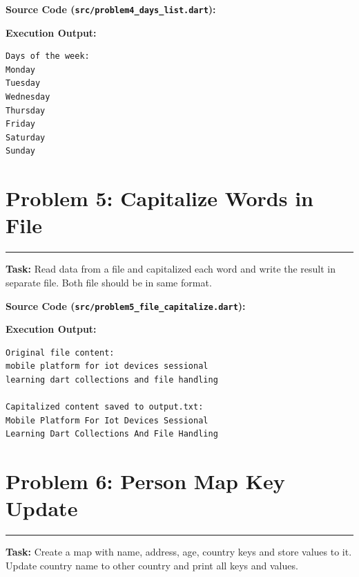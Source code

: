 \documentclass[11pt,a4paper]{article}
\begin{document}
\vspace{0.1cm}
\textbf{Source Code (\texttt{src/problem4\_days\_list.dart}):}


\textbf{Execution Output:}
\begin{lstlisting}[style=outputstyle]
Days of the week:
Monday
Tuesday
Wednesday
Thursday
Friday
Saturday
Sunday
\end{lstlisting}

\newpage

\section*{Problem 5: Capitalize Words in File}
\noindent\rule{\textwidth}{0.4pt}\vspace{0.08cm}
\textbf{Task:} Read data from a file and capitalized each word and write the result in separate file. Both file should be in same format.

\vspace{0.1cm}
\textbf{Source Code (\texttt{src/problem5\_file\_capitalize.dart}):}


\textbf{Execution Output:}
\begin{lstlisting}[style=outputstyle]
Original file content:
mobile platform for iot devices sessional
learning dart collections and file handling

Capitalized content saved to output.txt:
Mobile Platform For Iot Devices Sessional
Learning Dart Collections And File Handling
\end{lstlisting}

\newpage

\section*{Problem 6: Person Map Key Update}
\noindent\rule{\textwidth}{0.4pt}\vspace{0.08cm}
\textbf{Task:} Create a map with name, address, age, country keys and store values to it. Update country name to other country and print all keys and values.
\end{document}
